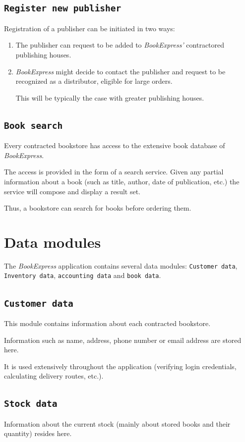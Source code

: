 \section{\texttt{Register new publisher}}
Registration of a publisher can be initiated in two ways:
\begin{enumerate}
	\item The publisher can request to be added to \emph{BookExpress'} contractored publishing houses.
	\item \emph{BookExpress} might decide to contact the publisher and request to be recognized as a distributor, eligible for large orders.
	      
		  This will be typically the case with greater publishing houses.
\end{enumerate}


\section{\texttt{Book search}}
Every contracted bookstore has access to the extensive book database of \emph{BookExpress}.

The access is provided in the form of a search service. Given any partial information about a book (such as title, author, date of publication, etc.)
the service will compose and display a result set.

Thus, a bookstore can search for books before ordering them.



\chapter{Data modules}
The \emph{BookExpress} application contains several data modules: \texttt{Customer data}, \texttt{Inventory data}, \texttt{accounting data} and \texttt{book data}.


\section{\texttt{Customer data}}
This module contains information about each contracted bookstore.

Information such as name, address, phone number or email address are stored here.

It is used extensively throughout the application (verifying login credentials, calculating delivery routes, etc.).


\section{\texttt{Stock data}}
Information about the current stock (mainly about stored books and their quantity) resides here.

